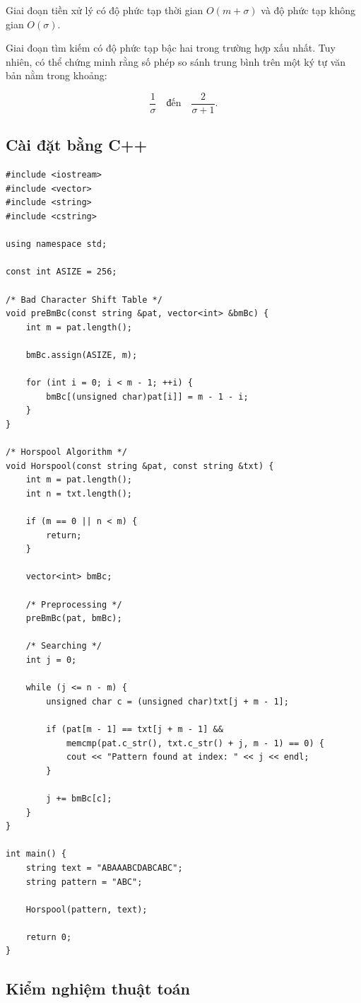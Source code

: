 Giai đoạn tiền xử lý có độ phức tạp thời gian \(O(m+\sigma)\) và độ phức tạp không gian \(O(\sigma)\).

Giai đoạn tìm kiếm có độ phức tạp bậc hai trong trường hợp xấu nhất. Tuy nhiên, có thể chứng minh rằng số phép so sánh trung bình trên một ký tự văn bản nằm trong khoảng:

\[
\frac{1}{\sigma}
\quad \text{đến} \quad
\frac{2}{\sigma+1}.
\]

\subsection{Cài đặt bằng C++}
\begin{verbatim}
#include <iostream>
#include <vector>
#include <string>
#include <cstring>

using namespace std;

const int ASIZE = 256;

/* Bad Character Shift Table */
void preBmBc(const string &pat, vector<int> &bmBc) {
    int m = pat.length();

    bmBc.assign(ASIZE, m);

    for (int i = 0; i < m - 1; ++i) {
        bmBc[(unsigned char)pat[i]] = m - 1 - i;
    }
}

/* Horspool Algorithm */
void Horspool(const string &pat, const string &txt) {
    int m = pat.length();
    int n = txt.length();

    if (m == 0 || n < m) {
        return;
    }

    vector<int> bmBc;

    /* Preprocessing */
    preBmBc(pat, bmBc);

    /* Searching */
    int j = 0;

    while (j <= n - m) {
        unsigned char c = (unsigned char)txt[j + m - 1];

        if (pat[m - 1] == txt[j + m - 1] &&
            memcmp(pat.c_str(), txt.c_str() + j, m - 1) == 0) {
            cout << "Pattern found at index: " << j << endl;
        }

        j += bmBc[c];
    }
}

int main() {
    string text = "ABAAABCDABCABC";
    string pattern = "ABC";

    Horspool(pattern, text);

    return 0;
}
\end{verbatim}

\subsection{Kiểm nghiệm thuật toán}

